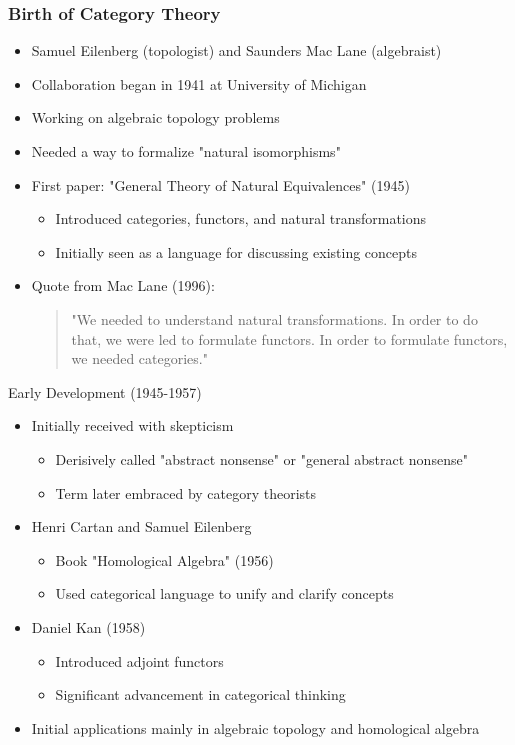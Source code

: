 \documentclass{beamer}
\begin{document}
\begin{frame}[fragile]
\frametitle{Birth of Category Theory}
    \begin{itemize}
        \item Samuel Eilenberg (topologist) and Saunders Mac Lane (algebraist)
        \item Collaboration began in 1941 at University of Michigan
        \item Working on algebraic topology problems
        \item Needed a way to formalize "natural isomorphisms"
        \item First paper: "General Theory of Natural Equivalences" (1945)
            \begin{itemize}
                \item Introduced categories, functors, and natural transformations
                \item Initially seen as a language for discussing existing concepts
            \end{itemize}
        \item Quote from Mac Lane (1996):
            \begin{quote}
                "We needed to understand natural transformations. In order to do that, we were led to formulate functors. In order to formulate functors, we needed categories."
            \end{quote}
    \end{itemize}
\end{frame}

\begin{frame}{Early Development (1945-1957)}
    \begin{itemize}
        \item Initially received with skepticism
            \begin{itemize}
                \item Derisively called "abstract nonsense" or "general abstract nonsense"
                \item Term later embraced by category theorists
            \end{itemize}
        \item Henri Cartan and Samuel Eilenberg
            \begin{itemize}
                \item Book "Homological Algebra" (1956)
                \item Used categorical language to unify and clarify concepts
            \end{itemize}
        \item Daniel Kan (1958)
            \begin{itemize}
                \item Introduced adjoint functors
                \item Significant advancement in categorical thinking
            \end{itemize}
        \item Initial applications mainly in algebraic topology and homological algebra
    \end{itemize}
\end{frame}
\end{document}
